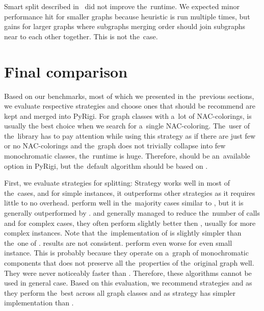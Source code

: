Smart split described in~
did not improve the~runtime.
We expected minor performance hit for smaller graphs because heuristic is run
multiple times, but gains for larger graphs where subgraphs merging order
should join subgraphs near to each other together. This is not the~case.

\section{Final comparison}

Based on our benchmarks, most of which we presented in the~previous sections,
we evaluate respective strategies and choose ones
that should be recommend are kept and merged into PyRigi.
%
For graph classes with a~lot of NAC-colorings,
\NaiveCycles{} is usually the best choice
when we search for a~single NAC-coloring.
%
The~user of the~library has to pay attention while using this strategy
as if there are just few or no NAC-colorings and the~graph does not trivially collapse
into few monochromatic classes, the~runtime is huge.
Therefore, \NaiveCycles{} should be an~available option in PyRigi,
but the~default algorithm should be based on \Subgraphs{}.

First, we evaluate strategies for splitting:
Strategy \None{} works well in most of the~cases, and for simple
 instances, it outperforms other strategies as it requires little to no overhead.
%
\CyclesMatchChunks{} perform well in the~majority cases similar to \None{},
but it is generally outperformed by \Neighbors{}.
%
\Neighbors{} and \NeighborsDegree{} generally managed to reduce the~number
of \IsNACColoring{} calls and for complex cases, they often
perform slightly better then \None{}, usually for more complex instances.
Note that the~implementation of \Neighbors{} is slightly simpler than
the~one of \NeighborsDegree{}.
%
\KernighanLin{} results are not consistent.
\Cuts{} perform even worse for even small instance.
This is probably because they operate on a~graph of monochromatic
components that does not preserve all the~properties
of the~original graph well.
They were never noticeably faster than \Neighbors{}.
Therefore, these algorithms cannot be used in general case.
%
Based on this evaluation, we recommend strategies \None{} and \Neighbors{}
as they perform the~best across all graph classes and
as \Neighbors{} strategy has simpler implementation than \NeighborsDegree{}.

